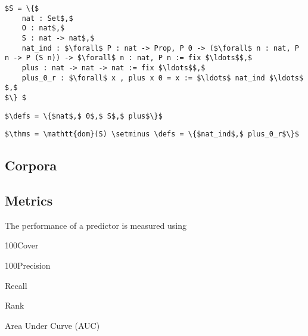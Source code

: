 \begin{lstlisting}[language=Coq, mathescape, frame=none]
$S = \{$
	nat : Set$,$
	O : nat$,$
	S : nat -> nat$,$
	nat_ind : $\forall$ P : nat -> Prop, P 0 -> ($\forall$ n : nat, P n -> P (S n)) -> $\forall$ n : nat, P n := fix $\ldots$$,$
	plus : nat -> nat -> nat := fix $\ldots$$,$
	plus_0_r : $\forall$ x , plus x 0 = x := $\ldots$ nat_ind $\ldots$ $,$
$\} $
\end{lstlisting}

\begin{lstlisting}[language=Coq, mathescape, frame=none]
$\defs = \{$nat$,$ 0$,$ S$,$ plus$\}$
\end{lstlisting}

\begin{lstlisting}[language=Coq, mathescape, frame=none]
$\thms = \mathtt{dom}(S) \setminus \defs = \{$nat_ind$,$ plus_0_r$\}$
\end{lstlisting}

\subsection{Corpora}
\begin{description}
    \item[\compcert]
    \item[\formalin]
    \item[\corn]
    \item[\mathcomp]
\end{description}

\subsection{Metrics}
The performance of a predictor is measured using 

\begin{definition}{100Cover}
\end{definition}

\begin{definition}{100Precision}
\end{definition}

\begin{definition}{Recall}
\end{definition}

\begin{definition}{Rank}
\end{definition}

\begin{definition}{Area Under Curve (AUC)}
\end{definition}

